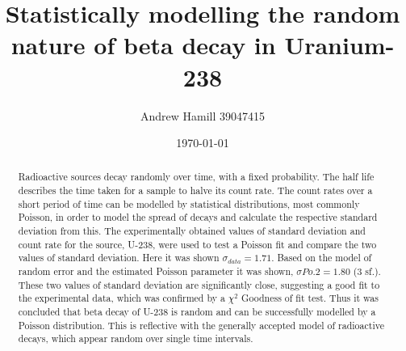 \documentclass[11pt]{article}
\begin{document}
    \title{Statistically modelling the random nature of beta decay in Uranium-238}
    \author{Andrew Hamill 39047415}
    \date{\today}
    \maketitle

    \begin{abstract}
    \normalsize Radioactive sources decay randomly over time, with a fixed probability. The half life describes the time taken for a sample to halve its count rate. The count rates over a short period of time can be modelled by statistical distributions, most commonly Poisson, in order to model the spread of decays and calculate the respective standard deviation from this. The experimentally obtained values of standard deviation and count rate for the source, U-238, were used to test a Poisson fit and compare the two values of standard deviation. Here it was shown $\sigma_{data} = 1.71$. Based on the model of random error and the estimated Poisson parameter it was shown, $\sigma{Po.2} = 1.80$ (3 sf.). These two values of standard deviation are significantly close, suggesting a good fit to the experimental data, which was confirmed by a $\chi^{2}$ Goodness of fit test. Thus it was concluded that beta decay of U-238 is random and can be successfully modelled by a Poisson distribution. This is reflective with the generally accepted model of radioactive decays, which appear random over single time intervals.  
    \end{abstract}
\end{document}
